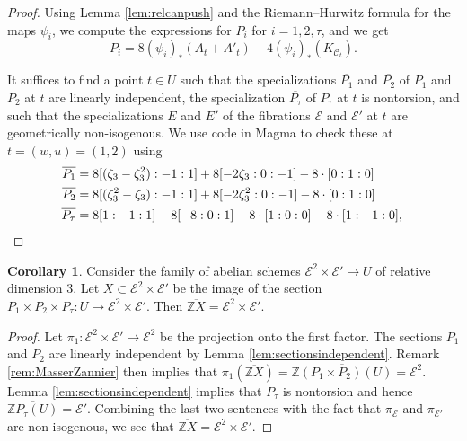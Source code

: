 \documentclass[reqno,10pt]{amsart}
\theoremstyle{definition}
\theoremstyle{definition}
\newtheorem{cor}[thm]{Corollary}
\def\Z{{\mathbb Z}}
\begin{document}
\begin{proof}
 Using Lemma \ref{lem:relcanpush} and the Riemann--Hurwitz formula for the maps $\psi_i$, we compute the expressions for $P_i$ for $i=1,2,\tau$, and  we get
\begin{equation}
 P_i= 8 (\psi_i)_*(A_{t}+A'_{t})-4(\psi_{i})_* (K_{\mathcal{C}_t}).
\end{equation}

It suffices to find a point $t \in U$ such that the specializations $\overline{P_1}$ and $\overline{P_2}$ of $P_1$ and $P_2$ at $t$ are linearly independent, the specialization $\overline{P_\tau}$ of $P_{\tau}$ at $t$ is nontorsion, and such that the specializations $E$ and $E'$ of the fibrations $\mathcal{E}$ and $\mathcal{E}'$ at $t$ are geometrically non-isogenous. We use code \cite{code} in Magma \cite{magma} to check these at $t=(w,u)=(1,2)$ using
\begin{align*}
\overline{P_1} &= 8[(\zeta_3-\zeta_3^2): -1:1]+8 [-2\zeta_3:0:-1]- 8\cdot[0:1:0]\\
\overline{P_2} &= 8[(\zeta_3^2-\zeta_3): -1:1]+8[-2\zeta_3^2:0:-1]- 8\cdot[0:1:0]\\
\overline{P_\tau} &= 8[1: -1:1]+8[-8:0:1]- 8\cdot[1:0:0]-8\cdot[1:-1:0], \qedhere 
\end{align*}
\end{proof}

\begin{cor}\label{cor:ZarClosDimension}
Consider the family of abelian schemes $\mathcal{E}^2\times \mathcal{E}'\rightarrow U$ of relative dimension $3$.  Let $X\subset \mathcal{E}^2\times \mathcal{E}'$ be the image of the section $P_1\times P_2\times P_{\tau} \colon U \rightarrow \mathcal{E}^2\times \mathcal{E}'$. Then $\overline{\Z X} = \mathcal{E}^2\times \mathcal{E}'$.
\end{cor}
\begin{proof} Let $\pi_{1} \colon \mathcal{E}^2\times \mathcal{E}' \rightarrow \mathcal{E}^2$ be the projection onto the first factor. The sections $P_1$ and $P_2$ are linearly independent by Lemma \ref{lem:sectionsindependent}. Remark \ref{rem:MasserZannier} then implies that $ \pi_1(\overline{\Z X}) = \overline{\Z (P_1 \times P_2)(U)} = \mathcal{E}^2$. Lemma \ref{lem:sectionsindependent} implies that $P_\tau$ is nontorsion and hence $\overline{\Z P_\tau(U)}=\mathcal{E}'$. Combining the last two sentences with the fact that $\pi_{\mathcal{E}}$ and $\pi_{\mathcal{E}'}$ are non-isogenous, we see that $\overline{\Z X}=\mathcal{E}^2\times \mathcal{E}'$.
\end{proof}
\end{document}
